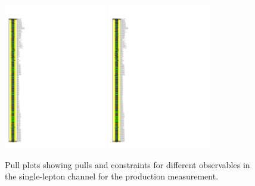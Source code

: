 \begin{figure}[ht]
  \centering
  \includegraphics[width=0.40\textwidth, viewport=0 375 150 750, clip]{figures/diff_xsec/ljet_tty_prod_mu_blinded/compare_NP_pulls/compare_NP_dilep_fits_pt_ptj1_eta/NuisPar_comp.pdf}%
  \includegraphics[width=0.40\textwidth, viewport=0 0 150 375, clip]{figures/diff_xsec/ljet_tty_prod_mu_blinded/compare_NP_pulls/compare_NP_dilep_fits_pt_ptj1_eta/NuisPar_comp.pdf}%
  \caption{Pull plots showing pulls and constraints for different observables in the single-lepton channel for the \tty production measurement.}
  \label{fig:pull_plot_pt_tty_dec_free_ljet_mu_blinded}
\end{figure}


